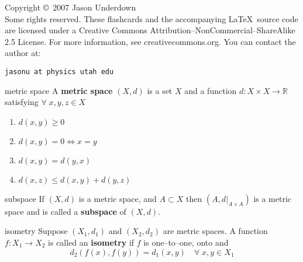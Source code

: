 \documentclass[avery5371,grid]{flashcards}
\newcommand{\R}{\mathbb{R}}
\begin{document}


\begin{flashcard}{Copyright \copyright \,
2007 Jason Underdown \\ Some rights reserved.}
These flashcards and the accompanying \LaTeX \, source code are licensed
under a Creative Commons Attribution--NonCommercial--ShareAlike 2.5 License.  
For more information, see creativecommons.org.  You can contact the author at:
\begin{center}
\begin{small}\tt jasonu at physics utah edu\end{small}
\end{center}
\end{flashcard}

\begin{flashcard}[Definition]{metric space}
A \textbf{metric space} $(X,d)$ is a set $X$ and a function
\mbox{$d: X \times X \rightarrow \R$} satisfying $\forall \; x,y,z \in X$
\begin{enumerate}
 \item $d(x,y) \geq 0$
 \item $d(x,y) = 0 \Leftrightarrow x=y$
 \item $d(x,y) = d(y,x)$
 \item $d(x,z) \leq d(x,y) + d(y,z)$
\end{enumerate}
\end{flashcard}

\begin{flashcard}[Definition]{subspace}
If $(X,d)$ is a metric space, and $A \subset X$ then
$(A,d|_{A \times A})$ is a metric space and is called
a \mbox{\textbf{subspace}} of $(X,d)$.
\end{flashcard}

\begin{flashcard}[Definition]{isometry}
Suppose $(X_1,d_1)$ and $(X_2,d_2)$ are metric spaces.  A function
$f: X_1 \rightarrow X_2$ is called an \mbox{\textbf{isometry}} if 
$f$ is one--to--one, onto and
\begin{equation*}
d_2(f(x),f(y)) = d_1(x,y) \quad \forall \; x,y \in X_1
\end{equation*}
\end{flashcard}
\end{document}

